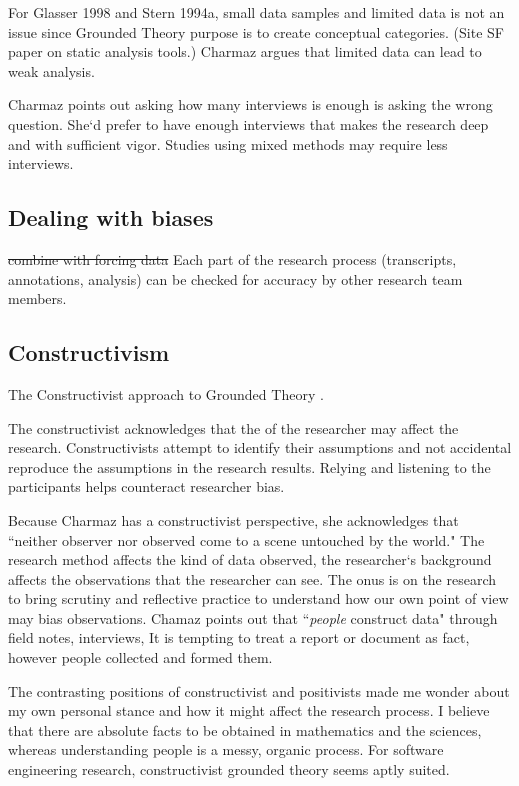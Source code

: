 For Glasser 1998 and Stern 1994a, small data samples and limited data is not an issue since Grounded Theory purpose is to create conceptual categories. (Site SF paper on static analysis tools.) Charmaz argues that limited data can lead to weak analysis. 


Charmaz points out asking how many interviews is enough is asking the wrong question. She`d prefer to have enough interviews that makes the research deep and with sufficient vigor. Studies using mixed methods may require less interviews.




\subsection{Dealing with biases}
\sout{combine with forcing data}
Each part of the research process (transcripts, annotations, analysis) can be checked for accuracy by other research team members. 


\subsection{Constructivism}
The Constructivist approach to Grounded Theory  \cite{StolGTinSE}. 

The constructivist acknowledges that the  of the researcher may affect the research. Constructivists attempt to identify their assumptions and not accidental reproduce the assumptions in the research results. Relying and listening to the participants helps counteract researcher bias.

Because Charmaz has a constructivist perspective, she acknowledges that ``neither observer nor observed come to a scene untouched by the world." The research method affects the kind of data observed, the researcher`s background affects the observations that the researcher can see. The onus is on the research to bring scrutiny and reflective practice to understand how our own point of view may bias observations. Chamaz points out that ``\textit{people} construct data" through field notes, interviews, It is tempting to treat a report or document as fact, however people collected and formed them.

The contrasting positions of constructivist and positivists made me wonder about my own personal stance and how it might affect the research process. 
I believe that there are absolute facts to be obtained in mathematics and the sciences, whereas understanding people is a messy, organic process. For software engineering research, constructivist grounded theory seems aptly suited.


